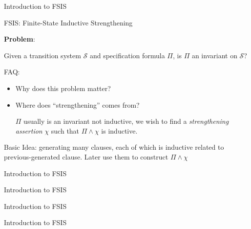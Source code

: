 \documentclass[aspectratio=1610, 13pt]{beamer}
\begin{document}
\begin{frame}{Introduction to FSIS}
\begin{center}

FSIS: Finite-State Inductive Strengthening
\end{center}

\textbf{Problem}: 

Given a transition system $\mathcal{S}$ and specification formula $\Pi$, is $\Pi$ an invariant on $\mathcal{S}$?


FAQ:
\begin{itemize}
\item Why does this problem matter?
\item Where does ``strengthening'' comes from?

$\Pi$ usually is an invariant not inductive, we wish to find a \textit{strengthening assertion} $\chi$ such that $\Pi\wedge \chi$ is inductive.
\end{itemize}


Basic Idea: generating many clauses, each of which is inductive related to previous-generated clause. Later use them to construct $\Pi\wedge \chi$
\end{frame}

\begin{frame}{Introduction to FSIS}

\end{frame}


\begin{frame}{Introduction to FSIS}

\end{frame}


\begin{frame}{Introduction to FSIS}

\end{frame}

\begin{frame}{Introduction to FSIS}

\end{frame}
\end{document}
